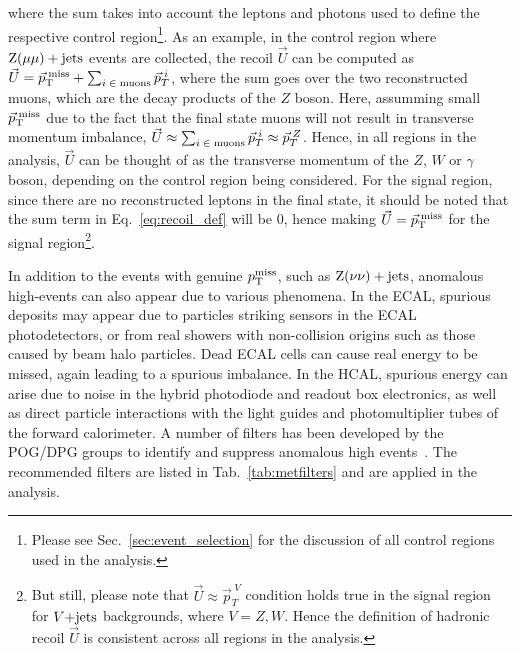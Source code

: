 where the sum takes into account the leptons and photons used to define the respective control 
region\footnote{Please see Sec.~\ref{sec:event_selection} for the discussion of all control regions
used in the analysis.}.
As an example, in the control region where $\mathrm{Z}(\mu\mu)+\textrm{jets}$ events are collected, the recoil $\vec{U}$ can be
computed as $\vec{U} = \vec{p}_{\textrm{T}}^{\;\textrm{miss}} + \sum_{i\;\in\;\textrm{muons}} \vec{p}_{T}^{\;i}$, where the sum goes over
the two reconstructed muons, which are the decay products of the $Z$ boson. Here, assumming small $\vec{p}_{\textrm{T}}^{\;\textrm{miss}}$
due to the fact that the final state muons will not result in transverse momentum imbalance, 
$\vec{U} \approx \sum_{i\;\in\;\textrm{muons}} \vec{p}_{T}^{\;i} \approx \vec{p}_T^{\;Z}$. Hence,
in all regions in the analysis, $\vec{U}$ can be thought of as the transverse momentum of the $Z$, $W$ or $\gamma$ 
boson, depending on the control region being considered.
For the signal region, 
since there are no reconstructed leptons in the final state, it should be noted that the sum term
in Eq.~\ref{eq:recoil_def} will be $0$, hence making $\vec{U} = \vec{p}_{\textrm{T}}^{\;\textrm{miss}}$ for the signal 
region\footnote{But still, please note that $\vec{U} \approx \vec{p}_T^{\;V}$ condition holds true in the
signal region for $V\text{+jets}$ backgrounds, where $V = Z, W$. Hence the definition of hadronic recoil $\vec{U}$ is consistent
across all regions in the analysis.}.


In addition to the events with genuine $p_{\textrm{T}}^{\textrm{miss}}$, such as $\textrm{Z}(\nu\nu)+\textrm{jets}$, 
anomalous high-\ptmiss events can also appear due to various phenomena.
In the ECAL, spurious deposits may appear due to particles striking
sensors in the ECAL photodetectors, or from real showers with non-collision
origins such as those caused by beam halo particles. Dead ECAL cells can cause real
energy to be missed, again leading to a spurious imbalance.
In the HCAL, spurious energy can arise due to  noise in the hybrid
photodiode and readout box  electronics, as well as
direct particle interactions with  the light guides and
photomultiplier tubes of the forward calorimeter. 
A number of filters has been developed by the POG/DPG groups to identify and suppress anomalous high
\ptmiss events~\cite{CMS-JME-TWIKI-FILTER}. The recommended filters are listed in Tab.~\ref{tab:metfilters} and are applied in the analysis.

